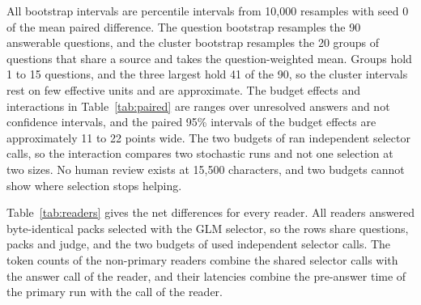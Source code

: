 All bootstrap intervals are percentile intervals from 10,000 resamples with seed 0 of the mean paired difference.
The question bootstrap resamples the 90 answerable questions, and the cluster bootstrap resamples the 20 groups of questions that share a source and takes the question-weighted mean.
Groups hold 1 to 15 questions, and the three largest hold 41 of the 90, so the cluster intervals rest on few effective units and are approximate.
The budget effects and interactions in Table~\ref{tab:paired} are ranges over unresolved answers and not confidence intervals, and the paired 95\% intervals of the budget effects are approximately 11 to 22 points wide.
The two budgets of \lexb{} ran independent selector calls, so the interaction compares two stochastic runs and not one selection at two sizes.
No human review exists at 15,500 characters, and two budgets cannot show where selection stops helping.

Table~\ref{tab:readers} gives the net differences for every reader.
All readers answered byte-identical packs selected with the GLM selector, so the rows share questions, packs and judge, and the two budgets of \lexb{} used independent selector calls.
The token counts of the non-primary readers combine the shared selector calls with the answer call of the reader, and their latencies combine the pre-answer time of the primary run with the call of the reader.


